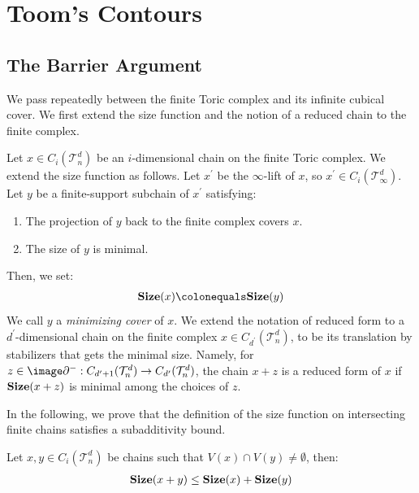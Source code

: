 \section{Toom's Contours}

\subsection{The Barrier Argument}
We pass repeatedly between the finite Toric complex and its infinite cubical cover. We first extend the size function and the notion of a reduced chain to the finite complex.  



\begin{definition}
  \label{def:mincover}
Let $x \in C_{i}(\mathcal{T}_n^d)$ be an $i$-dimensional chain on the finite Toric complex. We extend the size function as follows. Let $x^{\prime}$ be the $\infty$-lift of $x$, so $x^{\prime} \in C_{i}(\mathcal T_\infty^d)$. Let $y$ be a finite-support subchain of $x^{\prime}$ satisfying:
  \begin{enumerate}
    \item The projection of $y$ back to the finite complex covers $x$.
    \item The size of $y$ is minimal. 
  \end{enumerate}
  Then, we set: 
  \begin{equation*}
    \begin{split}
      \Size{x} \colonequals \Size{y}
    \end{split}
  \end{equation*}
We call $y$ a \emph{minimizing cover} of $x$. We extend the notation of reduced form to a $d^{\prime}$-dimensional chain on the finite complex $x \in C_{d^{\prime}}(\mathcal{T}_n^d)$, to be its translation by stabilizers that gets the minimal size. Namely, for $z \in \image \partial^{-} : C_{d^{\prime}+1}(\mathcal{T}_n^d) \rightarrow C_{d^{\prime}}(\mathcal{T}_n^d)$, the chain $x+z$ is a reduced form of $x$ if $\mathbf{Size}(x+z)$ is minimal among the choices of $z$.
\end{definition}
In the following, we prove that the definition of the size function on intersecting finite chains satisfies a subadditivity bound.
\begin{claim}
  \label{clima:finitetrig}
  Let $x,y\in C_{i}(\mathcal{T}_n^d)$ be chains such that $V(x) \cap V(y) \neq \emptyset$, then: 
  \begin{equation*}
    \begin{split}
      \mathbf{Size}(x + y) \le \mathbf{Size}(x) + \mathbf{Size}(y)
    \end{split}
  \end{equation*}
\end{claim}
